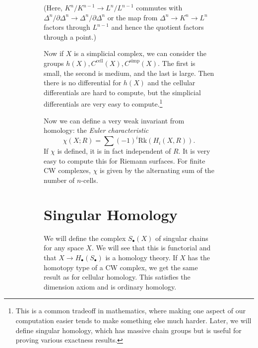 \documentclass[leqno, openany]{memoir}
\theoremstyle{definition}
\theoremstyle{remark}
\theoremstyle{plain}
\theoremstyle{definition}
\theoremstyle{remark}
\newcommand{\mr}[1]{\mathrm{#1}}
\begin{document}
\begin{figure}[H]
\begin{figure}[H]
(Here, $K^n / K^{n-1} \to L^n / L^{n-1}$ commutes with $\Delta^n / \partial
\Delta^n \to \Delta^n / \partial \Delta^n$ or the map from $\Delta^n \to K^n
\to L^n$ factors through $L^{n-1}$ and hence the quotient factors through a
point.) 

Now if $X$ is a simplicial complex, we can consider the groups $h(X),
C^{\mr{cell}}(X), C^{\mr{simp}}(X)$. The first is small, the second is medium,
and the last is large. Then there is no differential for $h(X)$ and the
cellular differentials are hard to compute, but the simplicial differentials
are very easy to compute.\footnote{This is a common tradeoff in mathematics,
where making one aspect of our computation easier tends to make something else
much harder. Later, we will define singular homology, which has massive chain
groups but is useful for proving various exactness results.}

Now we can define a very weak invariant from homology: the \textit{Euler
characteristic} \[ \chi(X; R) = \sum (-1)^i \mr{Rk}(H_i(X, R)). \] If $\chi$ is
defined, it is in fact independent of $R$. It is very easy to compute this for
Riemann surfaces. For finite CW complexes, $\chi$ is given by the alternating
sum of the number of $n$-cells.

\section{Singular Homology}%

We will define the complex $S_{\bullet}(X)$ of singular chains for any space
$X$. We will see that this is functorial and that $X \to
H_{\bullet}(S_{\bullet})$ is a homology theory. If $X$ has the homotopy type of
a CW complex, we get the same result as for cellular homology. This satisfies
the dimension axiom and is ordinary homology.


\end{figure}
\end{figure}
\end{document}
